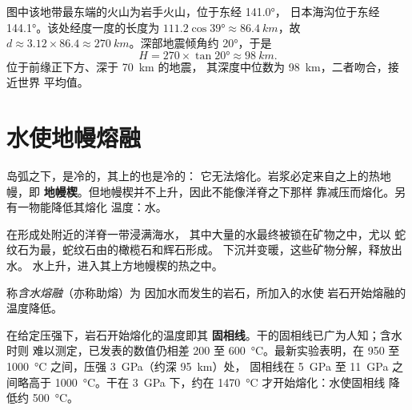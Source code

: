 \begin{example}[日本东北部]\label{ex:g12:subduction-magmatism:japan}
图中该地带最东端的火山为岩手火山，位于东经 \ang{141.0}，
日本海沟位于东经 \ang{144.1}。该处经度一度的长度为
$111.2\cos\ang{39} \approx \qty{86.4}{km}$，故 $d \approx 3.12 \times 86.4
\approx \qty{270}{km}$。深部地震倾角约 \ang{20}，于是
\[
  H = 270 \times \tan\ang{20} \approx \qty{98}{km}.
\]
位于前缘正下方、深于 \qty{70}{km} 的地震，
其深度中位数为 \qty{98}{km}，二者吻合，接近世界
平均值。
\end{example}

\section{水使地幔熔融}

岛弧之下，是冷的，其上的也是冷的：
它无法熔化。岩浆必定来自之上的热地幔，即
\textbf{地幔楔}。但地幔楔并不上升，因此不能像洋脊之下那样
靠减压而熔化。另有一物能降低其熔化
温度：水。

在形成处附近的洋脊一带浸满海水，
其中大量的水最终被锁在矿物之中，尤以
蛇纹石为最，蛇纹石由的橄榄石和辉石形成。
下沉并变暖，这些矿物分解，释放出水。
水上升，进入其上方地幔楔的热之中。

\begin{definition}[含水熔融]\label{def:g12:subduction-magmatism:hydrous-melting}
称\emph{含水熔融}（亦称助熔）为
因加水而发生的岩石，所加入的水使
岩石开始熔融的温度降低。
\end{definition}

在给定压强下，岩石开始熔化的温度即其
\textbf{固相线}。干的固相线已广为人知；含水时则
难以测定，已发表的数值仍相差 200 至
\qty{600}{\celsius}。最新实验表明，在 950 至
\qty{1000}{\celsius} 之间，压强 \qty{3}{GPa}（约深 \qty{95}{km}）处，
固相线在 \qty{5}{GPa} 至 \qty{11}{GPa} 之间略高于 \qty{1000}{\celsius}。干在 \qty{3}{GPa}
下，约在 \qty{1470}{\celsius} 才开始熔化：水使固相线
降低约 \qty{500}{\celsius}。

